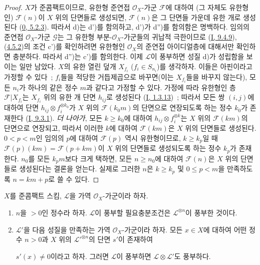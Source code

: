 \begin{proof}
$X$가 준콤팩트이므로, 유한형 준연접 $\mathcal{O}_X$-가군
$\mathcal{F}$에 대하여 (그 자체도 유한형인) $\mathcal{F}(n)$이 $X$
위의 단면들로 생성되면, $\mathcal{F}(n)$은 그 단면들 가운데 유한 개로
생성된다 (\hyperref[0.5.2.3-ko]{0, 5.2.3}). 따라서 d)는 d')를
함의하고, d')가 d'')를 함의함은 명백하다. 임의의 준연접
$\mathcal{O}_X$-가군 $\mathcal{G}$는 그 유한형 부분-$\mathcal{O}_X$-가군들의
귀납적 극한이므로 (\hyperref[I.9.4.9-ko]{I, 9.4.9}),
(\hyperref[II.4.5.2-ko]{4.5.2})의 조건 c')를 확인하려면 유한형인
$\mathcal{O}_X$의 준연접 아이디얼층에 대해서만 확인하면 충분하다.
따라서 d'')는 c')를 함의한다. 이제 $\mathcal{L}$이 풍부하면 성질 d)가
성립함을 보이는 일만 남았다. $X$의 유한 열린 덮개
$X_{f_i}$ ($f_i\in S_{n_i}$)를 생각하자. 이들은 아핀이라고 가정할 수
있다~; $f_i$들을 적당한 거듭제곱으로 바꾸면(이는 $X_{f_i}$들을
바꾸지 않는다), 모든 $n_i$가 하나의 같은 정수 $m$과 같다고 가정할
수 있다. 가정에 따라 유한형인 층 $\mathcal{F}|X_{f_i}$는
$X_{f_i}$ 위의 유한 개 단면 $h_{ij}$로 생성된다
(\hyperref[I.1.3.13-ko]{I, 1.3.13})~; 따라서 모든 쌍 $(i,j)$에 대하여
단면 $h_{ij}\otimes f_i^{\otimes k_0}$가 $X$ 위의
$\mathcal{F}(k_0m)$의 단면으로 연장되도록 하는 정수 $k_0$가 존재한다
(\hyperref[I.9.3.1-ko]{I, 9.3.1}). \emph{더 나아가}, 모든
$k\geq k_0$에 대하여 $h_{ij}\otimes f_i^{\otimes k}$는 $X$ 위의
$\mathcal{F}(km)$의 단면으로 연장되고, 따라서 이러한 $k$에 대하여
$\mathcal{F}(km)$은 $X$ 위의 단면들로 생성된다. $0<p<m$인 임의의
$p$에 대하여 $\mathcal{F}(p)$ 역시 유한형이므로,
$k\geq k_p$일 때 $\mathcal{F}(p)(km)=\mathcal{F}(p+km)$이 $X$ 위의
단면들로 생성되도록 하는 정수 $k_p$가 존재한다. $n_0$를 모든
$k_pm$보다 크게 택하면, 모든 $n\geq n_0$에 대하여 $\mathcal{F}(n)$은
$X$ 위의 단면들로 생성된다는 결론을 얻는다. 실제로 그러한 $n$은
$k\geq k_p$ 및 $0\leq p<m$을 만족하도록 $n=km+p$로 쓸 수 있다.
\end{proof}

\begin{proposition}[4.5.6]
\label{II.4.5.6-ko}
$X$를 준콤팩트 스킴, $\mathcal{L}$을 가역 $\mathcal{O}_X$-가군이라
하자.
\begin{enumerate}
  \item[\rm{(i)}] $n$을 $>0$인 정수라 하자. $\mathcal{L}$이
  풍부할 필요충분조건은 $\mathcal{L}^{\otimes n}$이 풍부한 것이다.
  \item[\rm{(ii)}] $\mathcal{L}'$을 다음 성질을 만족하는 가역
  $\mathcal{O}_X$-가군이라 하자. 모든 $x\in X$에 대하여 어떤 정수
  $n>0$과 $X$ 위의 $\mathcal{L}'^{\otimes n}$의 단면 $s'$이 존재하여


  $s'(x)\neq0$이라고 하자. 그러면 $\mathcal{L}$이 풍부하면
  $\mathcal{L}\otimes\mathcal{L}'$도 풍부하다.
\end{enumerate}
\end{proposition}

